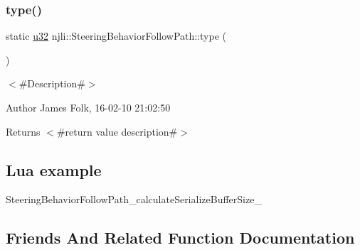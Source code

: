 \mbox{\label{classnjli_1_1_steering_behavior_follow_path_add1071a0484694e2bde97970647036b4}} 
\subsubsection{\texorpdfstring{type()}{type()}}
{\footnotesize\ttfamily static \mbox{\hyperlink{_util_8h_a10e94b422ef0c20dcdec20d31a1f5049}{u32}} njli\+::\+Steering\+Behavior\+Follow\+Path\+::type (\begin{DoxyParamCaption}{ }\end{DoxyParamCaption})\hspace{0.3cm}{\ttfamily [static]}}



$<$\#\+Description\#$>$ 

\begin{DoxyAuthor}{Author}
James Folk, 16-\/02-\/10 21\+:02\+:50
\end{DoxyAuthor}
\begin{DoxyReturn}{Returns}
$<$\#return value description\#$>$
\end{DoxyReturn}
\hypertarget{classnjli_1_1_steering_behavior_wander_ex1}{}\subsection{Lua example}\label{classnjli_1_1_steering_behavior_wander_ex1}

\begin{DoxyCodeInclude}
\end{DoxyCodeInclude}
Steering\+Behavior\+Follow\+Path\+\_\+calculate\+Serialize\+Buffer\+Size\+\_\+ 

\subsection{Friends And Related Function Documentation}
\mbox{\label{classnjli_1_1_steering_behavior_follow_path_acb96ebb09abe8f2a37a915a842babfac}} 
